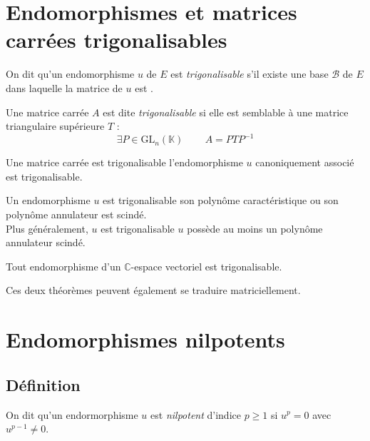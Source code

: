 \documentclass[11pt,a4paper,fleqn,pdftex]{report}
\begin{document}
\section{Endomorphismes et matrices carrées trigonalisables} %
\label{sec:endomorphismes_et_matrices_carrees_trigonalisables} 
\begin{dfn}
     On dit qu'un endomorphisme $u$ de $E$ est \emph{trigonalisable} s'il existe une base $\mathcal{B}$ de $E$ dans laquelle la matrice de $u$ est .
\end{dfn}
\begin{dfn}
     Une matrice carrée $A$ est dite \emph{trigonalisable} si elle est semblable à une matrice triangulaire supérieure $T$ : 
     \begin{equation}
      \exists P\in \mathrm{GL}_n(\mathbb{K})\, \qquad A = PTP^{-1}
      \end{equation} 
\end{dfn}
\begin{theorem}
     Une matrice carrée est trigonalisable \ssi{} l'endomorphisme $u$ canoniquement associé est trigonalisable.
\end{theorem}
\begin{itheorem}
     Un endomorphisme $u$ est trigonalisable \ssi{} son polynôme caractéristique ou son polynôme annulateur est scindé.\\
     Plus généralement, $u$ est trigonalisable \ssi{} $u$ possède au moins un polynôme annulateur scindé.
\end{itheorem}
\begin{theorem}
     Tout endomorphisme d'un $\mathbb{C}$-espace vectoriel est trigonalisable.
\end{theorem}
Ces deux théorèmes peuvent également se traduire matriciellement.
\section{Endomorphismes nilpotents} %
\label{sec:endomorphismes_nilpotents}
\subsection{Définition}
\begin{dfn}
     On dit qu'un endormorphisme $u$ est \emph{nilpotent} d'indice $p\ge 1$ si $u^p = 0$ avec $u^{p-1} \neq 0$.
\end{dfn}
\end{document}
